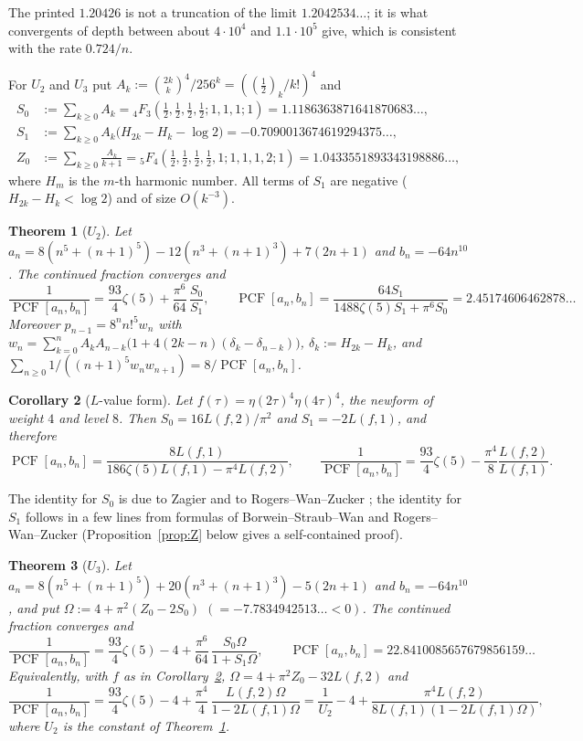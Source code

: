 \documentclass[11pt]{amsart}
\newtheorem{theorem}{Theorem}[section]
\newtheorem{corollary}[theorem]{Corollary}
\theoremstyle{definition}
\theoremstyle{remark}
\numberwithin{equation}{section}
\newcommand{\PCF}{\operatorname{PCF}}
\begin{document}
The printed $1.20426$ is not a truncation of the limit $1.2042534\ldots$; it is what convergents of depth between about $4\cdot10^4$ and $1.1\cdot10^5$ give, which is consistent with the rate $0.724/n$.

For $U_2$ and $U_3$ put $A_k:=\binom{2k}{k}^4/256^k=((\frac12)_k/k!)^4$ and
\begin{align*}
S_0&:=\sum_{k\ge0}A_k={}_4F_3(\tfrac12,\tfrac12,\tfrac12,\tfrac12;1,1,1;1)=1.1186363871641870683\ldots,\\
S_1&:=\sum_{k\ge0}A_k\bigl(H_{2k}-H_k-\log2\bigr)=-0.7090013674619294375\ldots,\\
Z_0&:=\sum_{k\ge0}\frac{A_k}{k+1}={}_5F_4(\tfrac12,\tfrac12,\tfrac12,\tfrac12,1;1,1,1,2;1)=1.0433551893343198886\ldots,
\end{align*}
where $H_m$ is the $m$-th harmonic number. All terms of $S_1$ are negative ($H_{2k}-H_k<\log 2$) and of size $O(k^{-3})$.

\begin{theorem}[$U_2$]\label{thm:U2}
Let $a_n=8(n^5+(n+1)^5)-12(n^3+(n+1)^3)+7(2n+1)$ and $b_n=-64n^{10}$. The continued fraction converges and
\[
\frac1{\PCF[a_n,b_n]}=\frac{93}{4}\zeta(5)+\frac{\pi^6}{64}\,\frac{S_0}{S_1},\qquad
\PCF[a_n,b_n]=\frac{64S_1}{1488\zeta(5)S_1+\pi^6S_0}=2.45174606462878\ldots
\]
Moreover $p_{n-1}=8^nn!^5w_n$ with $w_n=\sum_{k=0}^nA_kA_{n-k}\bigl(1+4(2k-n)(\delta_k-\delta_{n-k})\bigr)$, $\delta_k:=H_{2k}-H_k$, and $\sum_{n\ge0}1/((n+1)^5w_nw_{n+1})=8/\PCF[a_n,b_n]$.
\end{theorem}

\begin{corollary}[$L$-value form]\label{cor:U2L}
Let $f(\tau)=\eta(2\tau)^4\eta(4\tau)^4$, the newform of weight $4$ and level $8$. Then $S_0=16L(f,2)/\pi^2$ and $S_1=-2L(f,1)$, and therefore
\[
\PCF[a_n,b_n]=\frac{8L(f,1)}{186\zeta(5)L(f,1)-\pi^4L(f,2)},\qquad \frac1{\PCF[a_n,b_n]}=\frac{93}{4}\zeta(5)-\frac{\pi^4}{8}\frac{L(f,2)}{L(f,1)}.
\]
\end{corollary}

The identity for $S_0$ is due to Zagier \cite{Zag7} and to Rogers--Wan--Zucker \cite[(30)]{RWZ}; the identity for $S_1$ follows in a few lines from formulas of Borwein--Straub--Wan \cite{BSW} and Rogers--Wan--Zucker \cite[(31)]{RWZ} (Proposition~\ref{prop:Z} below gives a self-contained proof).

\begin{theorem}[$U_3$]\label{thm:U3}
Let $a_n=8(n^5+(n+1)^5)+20(n^3+(n+1)^3)-5(2n+1)$ and $b_n=-64n^{10}$, and put $\Omega:=4+\pi^2(Z_0-2S_0)$ $(=-7.7834942513\ldots<0)$. The continued fraction converges and
\[
\frac1{\PCF[a_n,b_n]}=\frac{93}{4}\zeta(5)-4+\frac{\pi^6}{64}\,\frac{S_0\Omega}{1+S_1\Omega},\qquad \PCF[a_n,b_n]=22.8410085657679856159\ldots
\]
Equivalently, with $f$ as in Corollary~\ref{cor:U2L}, $\Omega=4+\pi^2Z_0-32L(f,2)$ and
\[
\frac1{\PCF[a_n,b_n]}=\frac{93}{4}\zeta(5)-4+\frac{\pi^4}{4}\,\frac{L(f,2)\Omega}{1-2L(f,1)\Omega}
=\frac1{U_2}-4+\frac{\pi^4L(f,2)}{8L(f,1)(1-2L(f,1)\Omega)},
\]
where $U_2$ is the constant of Theorem~\ref{thm:U2}.
\end{theorem}
\end{document}

